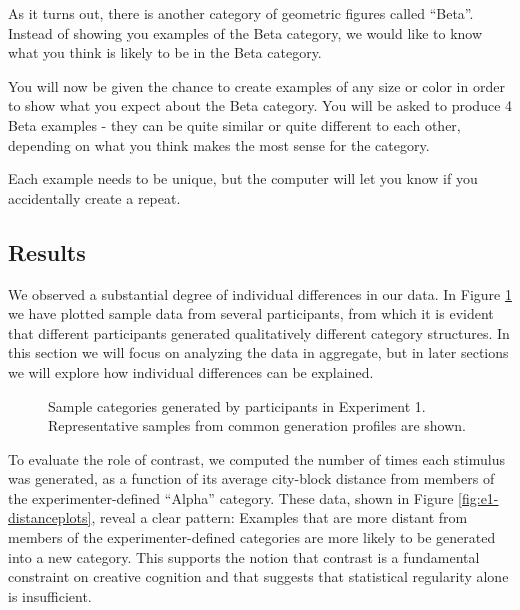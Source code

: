 \documentclass[12pt]{article}
\newcommand\inputpgf[2]{{
\let\pgfimageWithoutPath\pgfimage
\renewcommand{\pgfimage}[2][]{\pgfimageWithoutPath[##1]{#1/##2}}

}}
\begin{document}
\begin{flushleft}
\begin{displayquote} As it turns out, there is another category of geometric
figures called ``Beta''. Instead of showing you examples of the Beta category,
we would like to know what you think is likely to be in the Beta category.

You will now be given the chance to create examples of any size or color in
order to show what you expect about the Beta category. You will be asked to
produce 4 Beta examples - they can be quite similar or quite different to each
other, depending on what you think makes the most sense for the category.

Each example needs to be unique, but the computer will let you know if you
accidentally create a repeat.
\end{displayquote}

\subsection{Results}

We observed a substantial degree of individual differences in our data. In
Figure \ref{fig:e1-samples} we have plotted sample data from several
participants, from which it is evident that different participants generated
qualitatively different category structures. In this section we will focus on
analyzing the data in aggregate, but in later sections we will explore how
individual differences can be explained.

\begin{figure}
    \begin{center} \inputpgf{figs/}{e1-samples.pgf}
    \caption{Sample categories generated by participants in Experiment 1.
Representative samples from common generation profiles are shown.}
    \label{fig:e1-samples}
    \end{center}
\end{figure}

To evaluate the role of contrast, we computed the number of times each stimulus
was generated, as a function of its average city-block distance from members of
the experimenter-defined ``Alpha'' category. These data, shown in Figure
\ref{fig:e1-distanceplots}, reveal a clear pattern: Examples that are more
distant from members of the experimenter-defined categories are more likely to
be generated into a new category. This supports the notion that contrast is a
fundamental constraint on creative cognition and that suggests that statistical
regularity alone is insufficient.



\end{flushleft}
\end{document}
